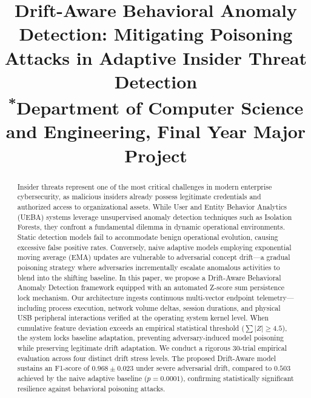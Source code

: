 \documentclass[conference]{IEEEtran}
\begin{document}
\title{Drift-Aware Behavioral Anomaly Detection: Mitigating Poisoning Attacks in Adaptive Insider Threat Detection\\
{\footnotesize \textsuperscript{*}Department of Computer Science and Engineering, Final Year Major Project}
}

\author{
\and
{}
}

\maketitle

\begin{abstract}
Insider threats represent one of the most critical challenges in modern enterprise cybersecurity, as malicious insiders already possess legitimate credentials and authorized access to organizational assets. While User and Entity Behavior Analytics (UEBA) systems leverage unsupervised anomaly detection techniques such as Isolation Forests, they confront a fundamental dilemma in dynamic operational environments. Static detection models fail to accommodate benign operational evolution, causing excessive false positive rates. Conversely, naive adaptive models employing exponential moving average (EMA) updates are vulnerable to adversarial concept drift—a gradual poisoning strategy where adversaries incrementally escalate anomalous activities to blend into the shifting baseline. In this paper, we propose a Drift-Aware Behavioral Anomaly Detection framework equipped with an automated Z-score sum persistence lock mechanism. Our architecture ingests continuous multi-vector endpoint telemetry—including process execution, network volume deltas, session durations, and physical USB peripheral interactions verified at the operating system kernel level. When cumulative feature deviation exceeds an empirical statistical threshold ($\sum |Z| \ge 4.5$), the system locks baseline adaptation, preventing adversary-induced model poisoning while preserving legitimate drift adaptation. We conduct a rigorous 30-trial empirical evaluation across four distinct drift stress levels. The proposed Drift-Aware model sustains an F1-score of $0.968 \pm 0.023$ under severe adversarial drift, compared to $0.503$ achieved by the naive adaptive baseline ($p = 0.0001$), confirming statistically significant resilience against behavioral poisoning attacks.
\end{abstract}
\end{document}
